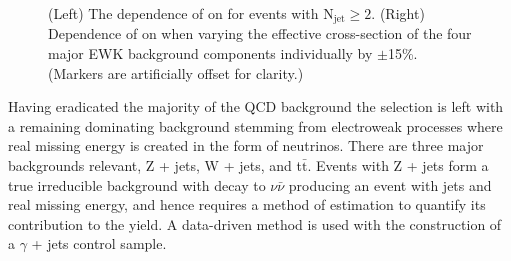 \begin{figure}[htbp]
  \begin{center}
      \caption{\label{fig:rat_vs_ht} (Left) The dependence of \RaT on
      \HT for events with N$_{\mathrm{jet}} \geq 2$. (Right) Dependence of \RaT on
      \HT when varying the effective cross-section of the four major
      EWK background components individually by $\pm$15\%. (Markers
      are artificially offset for clarity.) }
  \end{center}
\end{figure}

Having eradicated the majority of the QCD background the selection is left with a remaining dominating background stemming from electroweak processes where real missing energy is created in the form of neutrinos. There are three major backgrounds relevant, Z + jets, W + jets, and t$\bar{\textrm{t}}$. Events with Z + jets form a true irreducible background with decay to $\nu \bar{\nu}$ producing an event with jets and real missing energy, and hence requires a method of estimation to quantify its contribution to the yield. A data-driven method is used with the construction of a $\gamma$ + jets control sample.

